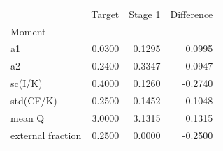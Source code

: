 \begin{tabular}{lrrr}
\toprule
 & Target & Stage 1 & Difference \\
Moment &  &  &  \\
\midrule
a1 & 0.0300 & 0.1295 & 0.0995 \\
a2 & 0.2400 & 0.3347 & 0.0947 \\
sc(I/K) & 0.4000 & 0.1260 & -0.2740 \\
std(CF/K) & 0.2500 & 0.1452 & -0.1048 \\
mean Q & 3.0000 & 3.1315 & 0.1315 \\
external fraction & 0.2500 & 0.0000 & -0.2500 \\
\bottomrule
\end{tabular}
